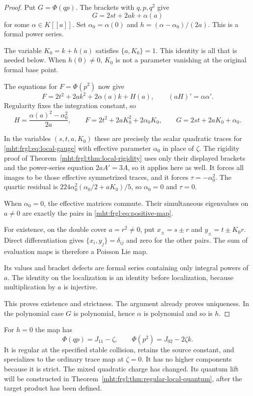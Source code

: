 \begin{proof}
Put $G=\Phi(qp)$. The brackets with $q,p,q^2$ give
\[
 G=2st+2ak+\alpha(a)
\]
for some $\alpha\in K[[a]]$. Set $\alpha_0=\alpha(0)$ and
$h=(\alpha-\alpha_0)/(2a)$. This is a formal power series.

The variable
$K_0=k+h(a)$ satisfies $\{a,K_0\}=1$. This identity is all that is
needed below. When $h(0)\ne0$, $K_0$ is not a parameter vanishing at
the original formal base point.

The equations for $F=\Phi(p^2)$ now give
\[
 F=2t^2+2ak^2+2\alpha(a)k+H(a),
 \qquad (aH)'=\alpha\alpha'.
\]
Regularity fixes the integration constant, so
\[
 H=\frac{\alpha(a)^2-\alpha_0^2}{2a},\qquad
 F=2t^2+2aK_0^2+2\alpha_0 K_0,
 \qquad G=2st+2aK_0+\alpha_0.
\]

In the variables $(s,t,a,K_0)$ these are precisely the scalar
quadratic traces for \eqref{mht:frgl:eq:local-gauge} with effective parameter
$\alpha_0$ in place of $\zeta$. The rigidity proof of
Theorem~\ref{mht:frgl:thm:local-rigidity} uses only their displayed brackets and
the power-series equation $2aA'=3A$, so it applies here as well. It forces all images
to be those effective symmetrized traces, and it forces
$\tau=-\alpha_0^2$. The quartic residual is
$224\alpha_0^2(\alpha_0/2+aK_0)/5$, so $\alpha_0=0$ and $\tau=0$.

When $\alpha_0=0$, the effective matrices commute. Their simultaneous
eigenvalues on $a\ne0$ are exactly the pairs in
\eqref{mht:frgl:eq:positive-map}.

For existence, on the double cover $a=r^2\ne0$, put
$x_\pm=s\pm r$ and $y_\pm=t\pm K_0r$. Direct differentiation gives
$\{x_i,y_j\}=\delta_{ij}$ and zero for the other pairs. The sum of
evaluation maps is therefore a Poisson Lie map.

Its values and bracket
defects are formal series containing only integral powers of $a$. The identity on the localization is an identity before localization,
because multiplication by $a$ is injective.

This proves existence and
strictness. The argument already proves uniqueness. In the polynomial
case $G$ is polynomial, hence $\alpha$ is polynomial and so is $h$.
\end{proof}

For $h=0$ the map has
\[
 \Phi(qp)=J_{11}-\zeta,\qquad
 \Phi(p^2)=J_{02}-2\zeta k.
\]
It is regular at the specified stable collision, retains the source
constant, and specializes to the ordinary trace map at $\zeta=0$.
It has no higher components because it is strict. The mixed quadratic charge has changed. Its quantum lift will be
constructed in Theorem~\ref{mht:frgl:thm:regular-local-quantum}, after the target
product has been defined.

